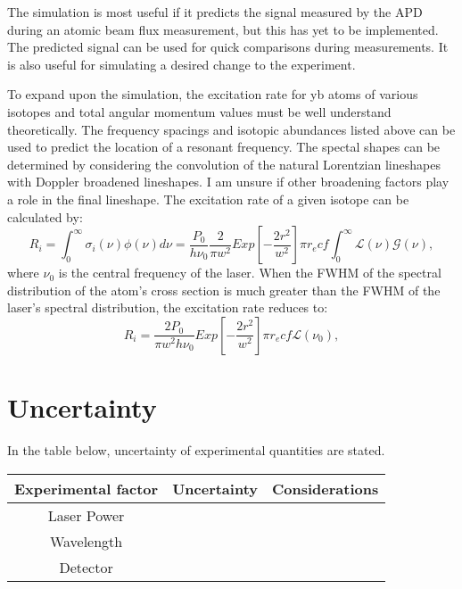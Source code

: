 \documentclass[12pt, a4paper]{article}
\begin{document}
The simulation is most useful if it predicts the signal measured by the APD during an atomic beam flux measurement, but this has yet to be implemented. The predicted signal can be used for quick comparisons during measurements. It is also useful for simulating a desired change to the experiment. 

To expand upon the simulation, the excitation rate for yb atoms of various isotopes and total angular momentum values must be well understand theoretically. The frequency spacings and isotopic abundances listed above can be used to predict the location of a resonant frequency. The spectal shapes can be determined by considering the convolution of the natural Lorentzian lineshapes with Doppler broadened lineshapes. I am unsure if other broadening factors play a role in the final lineshape. The excitation rate of a given isotope can be calculated by:
\begin{equation}
R_i = \int_{0}^{\infty}\sigma_i(\nu) \phi(\nu)d\nu = \frac{P_0}{h \nu_0} \frac{2}{\pi w^2} Exp[-\frac{2r^2}{w^2}]\pi r_e c f \int_{0}^{\infty} \mathscr{L}(\nu) \mathscr{G}(\nu),
\end{equation}
where $\nu_0$ is the central frequency of the laser. When the FWHM of the spectral distribution of the atom's cross section is much greater than the FWHM of the laser's spectral distribution, the excitation rate reduces to:
\begin{equation}
R_i =\frac{2P_0}{\pi w^2 h \nu_0} Exp[-\frac{2r^2}{w^2}] \pi r_e c f \mathscr{L} (\nu_0),
\end{equation}




\section{Uncertainty}
In the table below, uncertainty of experimental quantities are stated.
\begin{center}
\begin{tabular}{||c|c|c||}
\hline
Experimental factor & Uncertainty & Considerations\\
\hline\hline
 Laser Power &  & \\
\hline
 Wavelength &  & \\
\hline
 Detector &  &  \\
\hline 
\end{tabular}
\end{center}
\nocite{*}
{}

\end{document}

